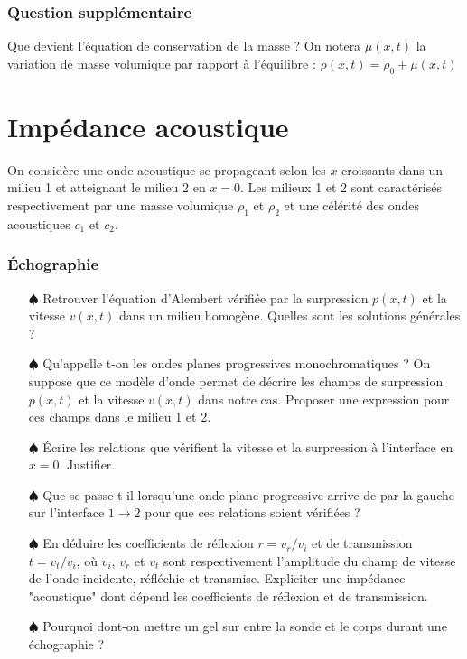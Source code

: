\documentclass{report}
\begin{document}
\subsubsection*{Question supplémentaire} 

Que devient l'équation de conservation de la masse ? On notera $\mu(x,t)$ la variation de masse volumique par rapport à l'équilibre : $\rho(x,t)=\rho_0+\mu(x,t)$

\newpage

\section*{Impédance acoustique}

On considère une onde acoustique se propageant selon les $x$ croissants dans un milieu 1 et atteignant le milieu 2 en $x=0$. Les milieux 1 et 2 sont caractérisés respectivement par une masse volumique $\rho_1$ et $\rho_2$ et une célérité des ondes acoustiques $c_1$ et $c_2$. 

\subsubsection*{Échographie}

\begin{itemize}
	
	\item[$\spadesuit$] Retrouver l'équation d'Alembert vérifiée par la surpression $p(x,t)$ et la vitesse $v(x,t)$ dans un milieu homogène. Quelles sont les solutions générales ? 
	
	\item[$\spadesuit$] Qu'appelle t-on les ondes planes progressives monochromatiques ? On suppose que ce modèle d'onde permet de décrire les champs de surpression $p(x,t)$ et la vitesse $v(x,t)$ dans notre cas. Proposer une expression pour ces champs dans le milieu 1 et 2.
	
	\item[$\spadesuit$] Écrire les relations que vérifient la vitesse et la surpression à l'interface en $x=0$. Justifier.
	
	\item[$\spadesuit$] Que se passe t-il lorsqu'une onde plane progressive arrive de par la gauche sur l'interface $1\longrightarrow2$ pour que ces relations soient vérifiées ?
	
	\item[$\spadesuit$] En déduire les coefficients de réflexion $r=v_r/v_i$ et de transmission $t=v_t/v_i$, où $v_i$, $v_r$ et $v_t$ sont respectivement l'amplitude du champ de vitesse de l'onde incidente, réfléchie et transmise. Expliciter une impédance "acoustique" dont dépend les coefficients de réflexion et de transmission.
	
	\item[$\spadesuit$] Pourquoi dont-on mettre un gel sur entre la sonde et le corps durant une échographie ? 
		
\end{itemize}
\end{document}
